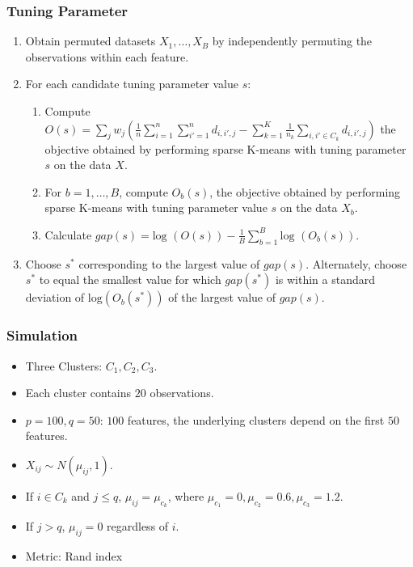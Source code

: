 \documentclass{beamer}
\begin{document}
\begin{frame}
\frametitle{Tuning Parameter}
\begin{enumerate}
\item Obtain permuted datasets $X_1,\ldots, X_B$ by independently permuting the observations within each feature.
\item For each candidate tuning parameter value $s$:
    \begin{enumerate}
    \item Compute
$
O(s) = \sum_j w_j (\frac{1}{n} \sum_{i=1}^n \sum_{i'=1}^n d_{i,i',j} - \sum_{k=1}^K \frac{1}{n_k} \sum_{i,i' \in C_k} d_{i,i',j} )
$
the objective obtained by performing sparse K-means with tuning parameter $s$ on the data $X$.
   \item For $b = 1,\ldots,B$, compute $O_b(s)$, the objective obtained by performing sparse K-means with tuning parameter value $s$ on the data $X_b$.
   \item Calculate $gap(s) = \text{log }(O(s)) - \frac{1}{B} \sum_{b=1}^B \text{log }(O_b(s))$.
   \end{enumerate}
\item Choose $s^*$ corresponding to the largest value of $gap(s)$.  Alternately, choose $s^*$ to equal the smallest value for which $gap(s^*)$ is within a standard deviation of $\text{log}(O_b(s^*))$ of the largest value of $gap(s)$.
\end{enumerate}
\end{frame}
\begin{frame}
\frametitle{Simulation}
\begin{itemize}
    \item Three Clusters: $C_1,C_2,C_3$.
    \item Each cluster contains $20$ observations.
    \item $p=100,q=50$: $100$ features, the underlying clusters depend on the first $50$ features.
    \item $X_{ij} \sim N(\mu_{ij},1)$.
    \item If $i \in C_k$ and $j \le q$, $\mu_{ij} = \mu_{c_k}$, where $\mu_{c_1}= 0,\mu_{c_2}=0.6,\mu_{c_3}=1.2$.
    \item If $j > q$, $\mu_{ij} = 0$ regardless of $i$.
    \item Metric: Rand index
\end{itemize}

\end{frame}
\end{document}
